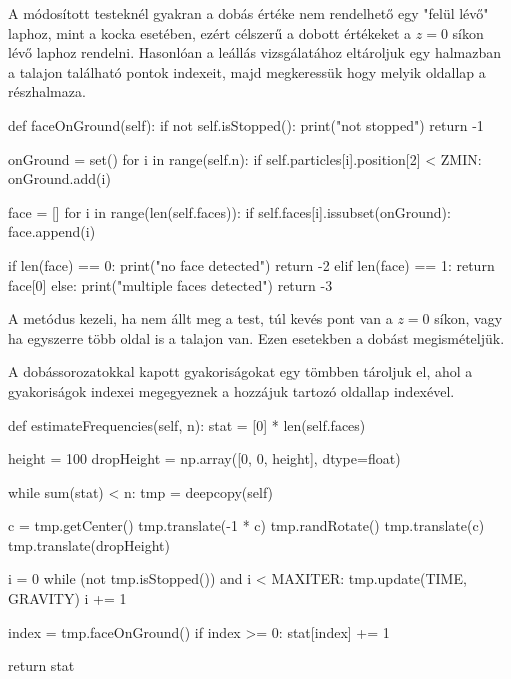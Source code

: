 
A módosított testeknél gyakran a dobás értéke nem rendelhető egy "felül lévő" laphoz, mint a kocka esetében, ezért célszerű a dobott értékeket a $z=0$ síkon lévő laphoz rendelni.
Hasonlóan a leállás vizsgálatához eltároljuk egy halmazban a talajon található pontok indexeit, majd megkeressük hogy melyik oldallap a részhalmaza.
\begin{python}
def faceOnGround(self):
    if not self.isStopped():
        print("not stopped")
        return -1

    onGround = set()
    for i in range(self.n):
        if self.particles[i].position[2] < ZMIN:
            onGround.add(i)

    face = []
    for i in range(len(self.faces)):
        if self.faces[i].issubset(onGround):
            face.append(i)

    if len(face) == 0:
        print("no face detected")
        return -2
    elif len(face) == 1:
        return face[0]
    else:
        print("multiple faces detected")
        return -3
\end{python}
\begin{remark}
A metódus kezeli, ha nem állt meg a test, túl kevés pont van a $z=0$ síkon, vagy ha egyszerre több oldal is a talajon van. Ezen esetekben a dobást megismételjük. 
\end{remark}
A dobássorozatokkal kapott gyakoriságokat egy tömbben tároljuk el, ahol a gyakoriságok indexei megegyeznek a hozzájuk tartozó oldallap indexével.
\begin{python}
def estimateFrequencies(self, n):
    stat = [0] * len(self.faces)

    height = 100
    dropHeight = np.array([0, 0, height], dtype=float)

    while sum(stat) < n:
        tmp = deepcopy(self)

        c = tmp.getCenter()
        tmp.translate(-1 * c)
        tmp.randRotate()
        tmp.translate(c)
        tmp.translate(dropHeight)

        i = 0
        while (not tmp.isStopped()) and i < MAXITER:
            tmp.update(TIME, GRAVITY)
            i += 1

        index = tmp.faceOnGround()
        if index >= 0:
            stat[index] += 1

    return stat
\end{python}